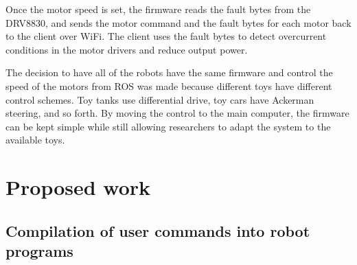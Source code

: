 Once the motor speed is set, the firmware reads the fault bytes from the DRV8830, and sends the motor command and the fault bytes for each motor back to the client over WiFi. 
The client uses the fault bytes to detect overcurrent conditions in the motor drivers and reduce output power. 

The decision to have all of the robots have the same firmware and control the speed of the motors from ROS was made because different toys have different control schemes. 
Toy tanks use differential drive, toy cars have Ackerman steering, and so forth. 
By moving the control to the main computer, the firmware can be kept simple while still allowing researchers to adapt the system to the available toys.


		
\section{Proposed work}


\subsection{Compilation of user commands into robot programs}


